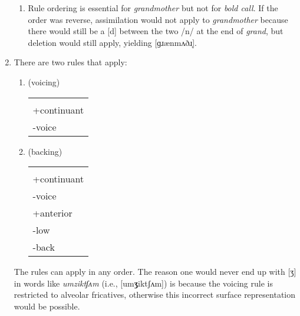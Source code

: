 \documentclass{article}
\newcommand{\rulealign}[1]{
    \begin{tabular}[t]{l}
      \\
      #1
    \end{tabular}
  }
\begin{document}
\begin{enumerate}
\begin{enumerate}
      \item Rule ordering is essential for \emph{grandmother} but not for \emph{bold call}. If the order was reverse, assimilation would not apply to \emph{grandmother} because there would still be a [d] between the two /n/ at the end of \emph{grand}, but deletion would still apply, yielding [ɡɹænmʌðɹ̩].
    \end{enumerate}
    \item There are two rules that apply:
    \begin{enumerate}
      \item (voicing) \rulealign{
        \phonl{\phonfeat[l]{-sonorant \\ +continuant \\ -voice}}{\phonfeat{+voice}}{\phonfeat{nasal}}
      }
      \item (backing) \rulealign{
        \phonr{\phonfeat[l]{-sonorant \\ +continuant \\ -voice \\ +anterior}}{\phonfeat{-anterior}}{\phonfeat[l]{+syllabic \\ -low \\ -back}}
      }
    \end{enumerate}
    The rules can apply in any order. The reason one would never end up with [ʒ] in words like \emph{umziktʃʌm} (i.e., [um\textbf{ʒ}iktʃʌm]) is because the voicing rule is restricted to alveolar fricatives, otherwise this incorrect surface representation would be possible.
  \end{enumerate}
\end{document}
